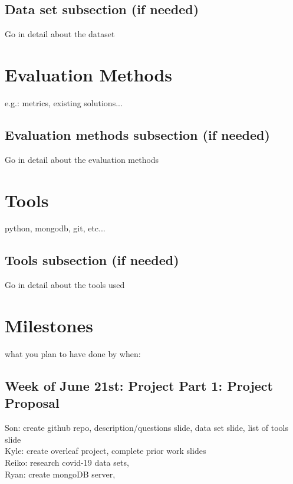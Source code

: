 \documentclass[11pt,sigconf]{acmart}
\begin{document}
\subsection{Data set subsection (if needed)}

Go in detail about the dataset



\section{Evaluation Methods}

e.g.: metrics, existing solutions...

\subsection{Evaluation methods subsection (if needed)}

Go in detail about the evaluation methods



\section{Tools}

python, mongodb, git, etc...

\subsection{Tools subsection (if needed)}

Go in detail about the tools used



\section{Milestones}

what you plan to have done by when: \\

\subsection{Week of June 21st: Project Part 1: Project Proposal}

Son: create github repo, description/questions slide, data set slide, list of tools slide\\
Kyle: create overleaf project, complete prior work slides \\
Reiko: research covid-19 data sets, \\
Ryan: create mongoDB server, \\
\end{document}
